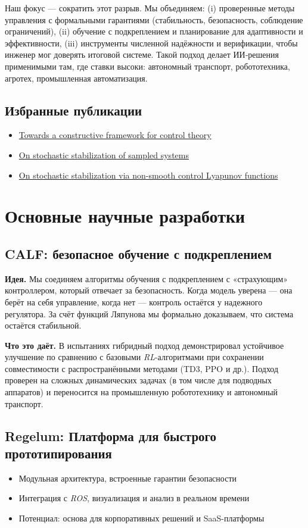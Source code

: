 \documentclass[12pt,a4paper]{article}
\begin{document}
Наш фокус — сократить этот разрыв. Мы объединяем: (i) проверенные методы управления с формальными гарантиями (стабильность, безопасность, соблюдение ограничений), (ii) обучение с подкреплением и планирование для адаптивности и эффективности, (iii) инструменты численной надёжности и верификации, чтобы инженер мог доверять итоговой системе. Такой подход делает ИИ‑решения применимыми там, где ставки высоки: автономный транспорт, робототехника, агротех, промышленная автоматизация.

\subsection*{Избранные публикации}
\begin{itemize}
    \item \href{https://arxiv.org/abs/2501.02267}{Towards a constructive framework for control theory}
    \item \href{https://arxiv.org/abs/2105.07152}{On stochastic stabilization of sampled systems}
    \item \href{https://arxiv.org/abs/2205.13409}{On stochastic stabilization via non-smooth control Lyapunov functions}
\end{itemize}

\section{Основные научные разработки}
\subsection{CALF: безопасное обучение с подкреплением}
\textbf{Идея.} Мы соединяем алгоритмы обучения с подкреплением с «страхующим» контроллером, который отвечает за безопасность. Когда модель уверена — она берёт на себя управление, когда нет — контроль остаётся у надежного регулятора. За счёт функций Ляпунова мы формально доказываем, что система остаётся стабильной.

\textbf{Что это даёт.} В испытаниях гибридный подход демонстрировал устойчивое улучшение по сравнению с базовыми \textit{RL}-алгоритмами при сохранении совместимости с распространёнными методами (TD3, PPO и др.). Подход проверен на сложных динамических задачах (в том числе для подводных аппаратов) и переносится на промышленную робототехнику и автономный транспорт.

\subsection{Regelum: Платформа для быстрого прототипирования}
\begin{itemize}
    \item Модульная архитектура, встроенные гарантии безопасности
    \item Интеграция с \textit{ROS}, визуализация и анализ в реальном времени
    \item Потенциал: основа для корпоративных решений и SaaS-платформы
\end{itemize}
\end{document}
